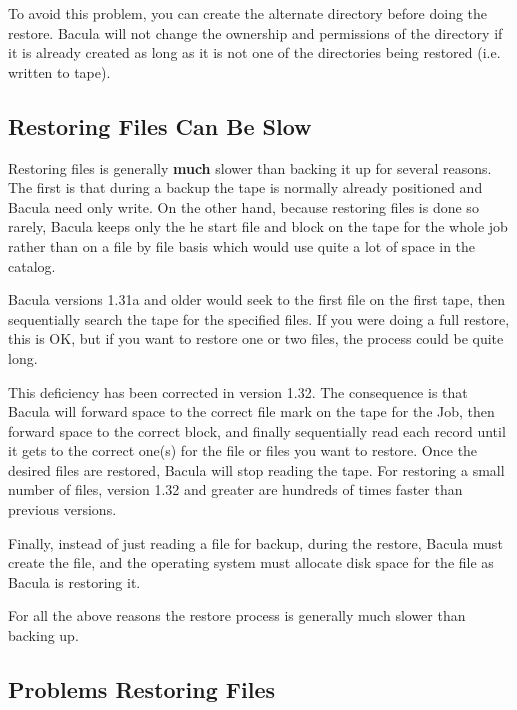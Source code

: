 To avoid this problem, you can create the alternate directory before doing the
restore. Bacula will not change the ownership and permissions of the directory
if it is already created as long as it is not one of the directories being
restored (i.e. written to tape). 

\subsection*{Restoring Files Can Be Slow}

Restoring files is generally {\bf much} slower than backing it up for several
reasons. The first is that during a backup the tape is normally already
positioned and Bacula need only write. On the other hand, because restoring
files is done so rarely, Bacula keeps only the he start file and block on the
tape for the whole job rather than on a file by file basis which would use
quite a lot of space in the catalog. 

Bacula versions 1.31a and older would seek to the first file on the first
tape, then sequentially search the tape for the specified files. If you were
doing a full restore, this is OK, but if you want to restore one or two files,
the process could be quite long. 

This deficiency has been corrected in version 1.32. The consequence is that
Bacula will forward space to the correct file mark on the tape for the Job,
then forward space to the correct block, and finally sequentially read each
record until it gets to the correct one(s) for the file or files you want to
restore. Once the desired files are restored, Bacula will stop reading the
tape. For restoring a small number of files, version 1.32 and greater are
hundreds of times faster than previous versions. 

Finally, instead of just reading a file for backup, during the restore, Bacula
must create the file, and the operating system must allocate disk space for
the file as Bacula is restoring it. 

For all the above reasons the restore process is generally much slower than
backing up. 

\subsection*{Problems Restoring Files}

